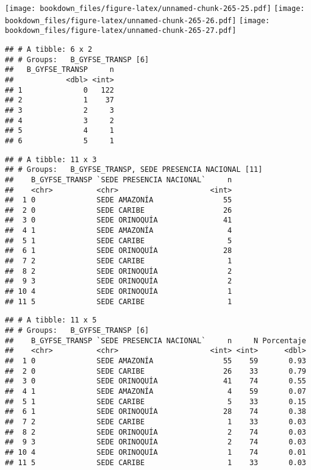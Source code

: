 \documentclass[]{article}
\theoremstyle{definition}
\theoremstyle{definition}
\theoremstyle{definition}
\theoremstyle{remark}
\begin{document}
\texttt{[image: bookdown\_files/figure-latex/unnamed-chunk-265-25.pdf]}
\texttt{[image: bookdown\_files/figure-latex/unnamed-chunk-265-26.pdf]}
\texttt{[image: bookdown\_files/figure-latex/unnamed-chunk-265-27.pdf]}

\begin{verbatim}
## # A tibble: 6 x 2
## # Groups:   B_GYFSE_TRANSP [6]
##   B_GYFSE_TRANSP     n
##            <dbl> <int>
## 1              0   122
## 2              1    37
## 3              2     3
## 4              3     2
## 5              4     1
## 6              5     1
\end{verbatim}

\begin{verbatim}
## # A tibble: 11 x 3
## # Groups:   B_GYFSE_TRANSP, SEDE PRESENCIA NACIONAL [11]
##    B_GYFSE_TRANSP `SEDE PRESENCIA NACIONAL`     n
##    <chr>          <chr>                     <int>
##  1 0              SEDE AMAZONÍA                55
##  2 0              SEDE CARIBE                  26
##  3 0              SEDE ORINOQUÍA               41
##  4 1              SEDE AMAZONÍA                 4
##  5 1              SEDE CARIBE                   5
##  6 1              SEDE ORINOQUÍA               28
##  7 2              SEDE CARIBE                   1
##  8 2              SEDE ORINOQUÍA                2
##  9 3              SEDE ORINOQUÍA                2
## 10 4              SEDE ORINOQUÍA                1
## 11 5              SEDE CARIBE                   1
\end{verbatim}

\begin{verbatim}
## # A tibble: 11 x 5
## # Groups:   B_GYFSE_TRANSP [6]
##    B_GYFSE_TRANSP `SEDE PRESENCIA NACIONAL`     n     N Porcentaje
##    <chr>          <chr>                     <int> <int>      <dbl>
##  1 0              SEDE AMAZONÍA                55    59       0.93
##  2 0              SEDE CARIBE                  26    33       0.79
##  3 0              SEDE ORINOQUÍA               41    74       0.55
##  4 1              SEDE AMAZONÍA                 4    59       0.07
##  5 1              SEDE CARIBE                   5    33       0.15
##  6 1              SEDE ORINOQUÍA               28    74       0.38
##  7 2              SEDE CARIBE                   1    33       0.03
##  8 2              SEDE ORINOQUÍA                2    74       0.03
##  9 3              SEDE ORINOQUÍA                2    74       0.03
## 10 4              SEDE ORINOQUÍA                1    74       0.01
## 11 5              SEDE CARIBE                   1    33       0.03
\end{verbatim}
\end{document}
